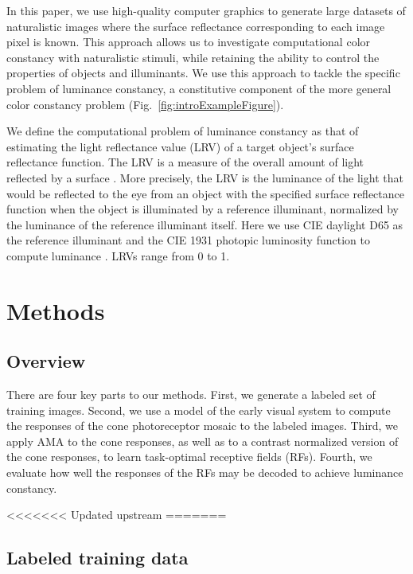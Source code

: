 \documentclass{jov}
\begin{document}
In this paper, we use high-quality computer graphics to generate large datasets of naturalistic images where the surface reflectance corresponding to each image pixel is known. 
This approach allows us to investigate computational color constancy with naturalistic stimuli, while retaining the ability to control the properties of objects and illuminants. We use this approach to tackle the specific problem of luminance constancy, a constitutive component of the more general color constancy problem (Fig.~\ref{fig:introExampleFigure}). 

We define the computational problem of luminance constancy as that of estimating the light reflectance value (LRV) of a target object's surface reflectance function.
The LRV is a measure of the overall amount of light reflected by a surface \cite{astm1121477}. %
More precisely, the LRV is the luminance of the light that would be reflected to the eye from an object with the 
specified surface reflectance function when the object is illuminated by a reference illuminant,
normalized by the luminance of the reference illuminant itself.
Here we use CIE daylight D65 as the reference illuminant and the CIE 1931 photopic luminosity function to compute luminance \cite{CIE86}.
LRVs range from 0 to 1. %

\section*{Methods} \label{Methods}
\subsection{Overview}
There are four key parts to our methods.  First, we generate a labeled set of training images.  Second, we use a model of the early visual system to compute the responses of the cone photoreceptor mosaic to the labeled images. Third, we apply AMA to the cone responses, as well as to a contrast normalized version of the cone responses, to learn task-optimal receptive fields (RFs). Fourth, we evaluate how well the responses of the RFs may be decoded to achieve luminance constancy.

<<<<<<< Updated upstream
=======
\subsection{Labeled training data} \label{method:VirtualWorld}
\end{document}
